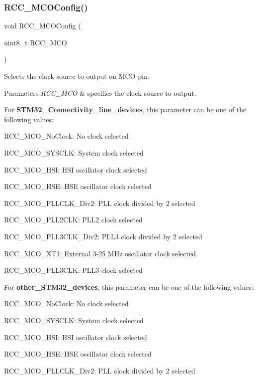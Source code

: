 \subsubsection{\texorpdfstring{R\+C\+C\+\_\+\+M\+C\+O\+Config()}{RCC\_MCOConfig()}}
{\footnotesize\ttfamily void R\+C\+C\+\_\+\+M\+C\+O\+Config (\begin{DoxyParamCaption}\item[{uint8\+\_\+t}]{R\+C\+C\+\_\+\+M\+CO }\end{DoxyParamCaption})}



Selects the clock source to output on M\+CO pin. 


\begin{DoxyParams}{Parameters}
{\em R\+C\+C\+\_\+\+M\+CO} & specifies the clock source to output.\\
\hline
\end{DoxyParams}
For {\bfseries S\+T\+M32\+\_\+\+Connectivity\+\_\+line\+\_\+devices}, this parameter can be one of the following values\+: \begin{DoxyItemize}
\item R\+C\+C\+\_\+\+M\+C\+O\+\_\+\+No\+Clock\+: No clock selected \item R\+C\+C\+\_\+\+M\+C\+O\+\_\+\+S\+Y\+S\+C\+LK\+: System clock selected \item R\+C\+C\+\_\+\+M\+C\+O\+\_\+\+H\+SI\+: H\+SI oscillator clock selected \item R\+C\+C\+\_\+\+M\+C\+O\+\_\+\+H\+SE\+: H\+SE oscillator clock selected \item R\+C\+C\+\_\+\+M\+C\+O\+\_\+\+P\+L\+L\+C\+L\+K\+\_\+\+Div2\+: P\+LL clock divided by 2 selected \item R\+C\+C\+\_\+\+M\+C\+O\+\_\+\+P\+L\+L2\+C\+LK\+: P\+L\+L2 clock selected \item R\+C\+C\+\_\+\+M\+C\+O\+\_\+\+P\+L\+L3\+C\+L\+K\+\_\+\+Div2\+: P\+L\+L3 clock divided by 2 selected \item R\+C\+C\+\_\+\+M\+C\+O\+\_\+\+X\+T1\+: External 3-\/25 M\+Hz oscillator clock selected \item R\+C\+C\+\_\+\+M\+C\+O\+\_\+\+P\+L\+L3\+C\+LK\+: P\+L\+L3 clock selected\end{DoxyItemize}
For {\bfseries other\+\_\+\+S\+T\+M32\+\_\+devices}, this parameter can be one of the following values\+: \begin{DoxyItemize}
\item R\+C\+C\+\_\+\+M\+C\+O\+\_\+\+No\+Clock\+: No clock selected \item R\+C\+C\+\_\+\+M\+C\+O\+\_\+\+S\+Y\+S\+C\+LK\+: System clock selected \item R\+C\+C\+\_\+\+M\+C\+O\+\_\+\+H\+SI\+: H\+SI oscillator clock selected \item R\+C\+C\+\_\+\+M\+C\+O\+\_\+\+H\+SE\+: H\+SE oscillator clock selected \item R\+C\+C\+\_\+\+M\+C\+O\+\_\+\+P\+L\+L\+C\+L\+K\+\_\+\+Div2\+: P\+LL clock divided by 2 selected\end{DoxyItemize}

